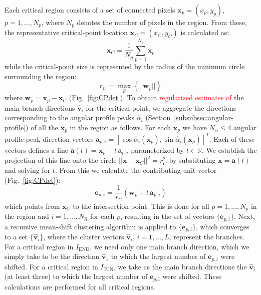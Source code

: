 \documentclass[twocolumn,natbib]{svjour3}
\newcommand{\marked}[1]{\textcolor{red}{#1}}
\begin{document}
Each critical region consists of a set of connected pixels $\mathbf{x}_p=(x_p,y_p)$, $p=1,\dots,N_p$, where $N_p$ denotes the number of pixels in the region. From these, the representative critical-point location $\mathbf{x}_C=(x_C,y_C)$ is calculated as:
\begin{equation}
\mathbf{x}_C=\frac{1}{N_p}\sum_{p=1}^{N_p}\mathbf{x}_p
\end{equation}
while the critical-point size is represented by the radius of the minimum circle surrounding the region:
\begin{equation}
r_C = \max_{p}\left\{||\mathbf{w}_p||\right\}
\end{equation}
where $\mathbf{w}_p=\mathbf{x}_p-\mathbf{x}_C$ (Fig.~\ref{fig:CPdet}). To obtain \marked{regularized estimates of} the main branch directions $\hat{\mathbf{v}}_i$ for the critical point, we aggregate the directions corresponding to the angular profile peaks $\hat{\alpha}_i$ (Section~\ref{subsubsec:angular-profile}) of all the $\mathbf{x}_p$ in the region as follows. For each $\mathbf{x}_p$ we have $N_{\hat{\alpha}}\leq4$ angular profile peak direction vectors $\mathbf{a}_{p,i}=[\cos\hat{\alpha}_i(\mathbf{x}_p),\sin\hat{\alpha}_i(\mathbf{x}_p)]^T$. Each of these vectors defines a line $\mathbf{a}(t)=\mathbf{x}_{p}+t\,\mathbf{a}_{p,i}$ parameterized by $t\in\mathbb{R}$. We establish the projection of this line onto the circle $||\mathbf{x}-\mathbf{x}_C||^2=r^2_C$ by substituting $\mathbf{x}=\mathbf{a}(t)$ and solving for $t$. From this we calculate the contributing unit vector (Fig.~\ref{fig:CPdet}):
\begin{equation}
\mathbf{e}_{p,i}=\frac{1}{r_C}(\mathbf{w}_{p}+t\,\mathbf{a}_{p,i})
\end{equation}
which points from $\mathbf{x}_C$ to the intersection point. This is done for all $p=1,\dots,N_p$ in the region and $i=1,\dots,N_{\hat{\alpha}}$ for each $p$, resulting in the set of vectors $\{\mathbf{e}_{p,i}\}$. Next, a recursive mean-shift clustering algorithm \citep{cheng1995mean} is applied to $\{\mathbf{e}_{p,i}\}$, which converges to a set $\{\hat{\mathbf{v}}_{i}\}$, where the cluster vectors $\hat{\mathbf{v}}_{i}$, $i=1,\dots,L$, represent the branches. For a critical region in $I_{\textrm{END}}$, we need only one main branch direction, which we simply take to be the direction $\hat{\mathbf{v}}_1$ to which the largest number of $\mathbf{e}_{p,i}$ were shifted. For a critical region in $I_{\textrm{JUN}}$, we take as the main branch directions the $\hat{\mathbf{v}}_i$ (at least three) to which the largest number of $\mathbf{e}_{p,i}$ were shifted. These calculations are performed for all critical regions.
\end{document}
